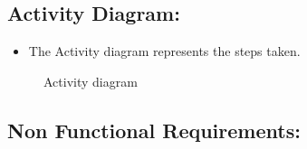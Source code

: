 \documentclass[a4paper,14pt,onecolumn]{report}
\begin{document}
	\subsection{Activity Diagram:}
	\begin{itemize}
		\item	The Activity diagram represents the steps taken.
	\end{itemize} 
	\begin{center}
		\begin{figure}[!htbp]
			\centering
			\caption{Activity diagram}
			\label{fig:act-dig}
		\end{figure}
	\end{center}  
	
	
	\subsection{Non Functional Requirements:}
\end{document}
